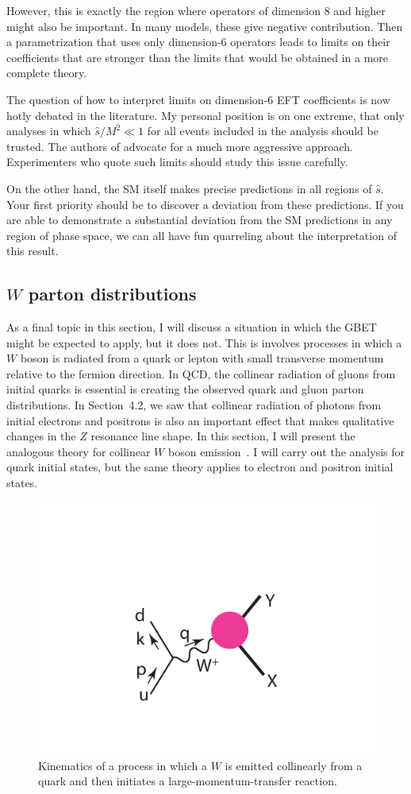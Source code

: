 \documentclass[12pt]{article}
\begin{document}
However, this is exactly the region where operators of dimension 8 and
higher might also be important.  In many models, these give negative
contribution.  Then  a parametrization that uses only  dimension-6
operators leads to limits on their coefficients that are stronger than
the limits that would be obtained in a more complete theory.


The question of how to interpret limits on dimension-6 EFT
coefficients is now hotly debated in the literature.   My personal
position is on one extreme, that only analyses in which $\hat s/M^2
\ll 1$ for all events included in the analysis  should be trusted.  
The authors of \cite{FalkowskiWW} advocate
for a much more aggressive approach.   Experimenters who quote such
limits should study this issue carefully.

On the other hand, the SM itself makes precise predictions in all
regions of $\hat s$. Your first priority should be to discover a
deviation from these predictions.   If you are able to demonstrate a
substantial deviation from the SM predictions in any region of phase
space, we can all have 
fun quarreling about the interpretation of this result.


\subsection{$W$ parton distributions}

As a final topic in this section, I will discuss a situation in which
the GBET might be expected to apply, but it does not.  This is
involves processes in which a $W$ boson is radiated from a quark or
lepton with
small transverse momentum relative to the fermion direction.   In  
QCD, the collinear radiation of gluons from initial quarks is
essential is creating the observed quark and gluon parton
distributions.  In Section~4.2, we saw that collinear radiation of
photons from initial electrons and positrons is also an important
effect that makes qualitative changes in the $Z$ resonance line shape.
In this section, I will present the analogous theory for collinear $W$
boson emission~\cite{Dawson}.    I will carry out the analysis for
quark initial states, but the same theory applies to electron and
positron initial states.

\begin{figure}
\begin{center}
\includegraphics[width=0.30\hsize]{Wexchange.pdf}
\end{center}
\caption{Kinematics of a process in which a $W$ is emitted collinearly
  from a quark and then initiates a large-momentum-transfer reaction.}
\label{fig:Wexchange}
\end{figure}
\end{document}

